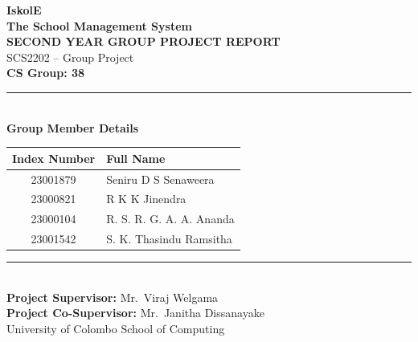 \documentclass[12pt, a4paper]{report}
\begin{document}
\begin{titlepage}
    \centering
    \vspace*{0.2cm}

    {\Huge\textbf{\color{themedarkblue}IskolE}}\\[0.3cm]
    {\LARGE\textbf{\color{themeblue}The School Management System}}\\[0.8cm]

    {\Large\textbf{\color{themedarkblue}SECOND YEAR GROUP PROJECT REPORT}}\\[0.3cm]
    {\large SCS2202 -- Group Project}\\[0.5cm]

    {\Large\textbf{CS Group: 38}}\\[0.5cm]

    {\color{themeblue}\rule{0.8\textwidth}{0.4pt}}\\[0.5cm]

    {\large\textbf{\color{themedarkblue}Group Member Details}}\\[0.3cm]
    \begin{table}[H]
    \centering
    \renewcommand{\arraystretch}{1.5}
    \begin{tabular}{|c|l|}
    \hline
    \rowcolor{themelightblue}
    \textbf{Index Number} & \textbf{Full Name} \\
    \hline
    23001879 & Seniru D S Senaweera \\
    \hline
    23000821 & R K K Jinendra \\
    \hline
    23000104 & R. S. R. G. A. A. Ananda \\
    \hline
    23001542 & S. K. Thasindu Ramsitha \\
    \hline
    \end{tabular}
    \end{table}

    \vspace{0.3cm}
    {\color{themeblue}\rule{0.8\textwidth}{0.4pt}}\\[0.5cm]

    {\large
    \textbf{Project Supervisor:} Mr.\ Viraj Welgama\\[0.2cm]
    \textbf{Project Co-Supervisor:} Mr.\ Janitha Dissanayake
    }\\[0.8cm]

    {\large University of Colombo School of Computing}\\[0.2cm]
    {\large \the\year}

    \vfill
\end{titlepage}
\end{document}
